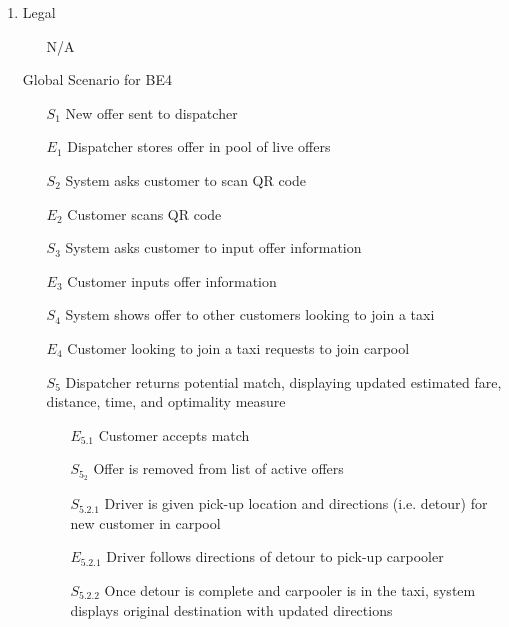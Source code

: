 \documentclass[]{article}
\begin{document}
\begin{enumerate}[{\textbf{BE}}1.]
\begin{enumerate}[{VP4}.1]
        \item Legal
            \begin{enumerate}
                \item[N/A]
            \end{enumerate}
        \item[Global] Scenario for BE4
            \begin{enumerate}
                \item[$S_1$] New offer sent to dispatcher
                \item[$E_1$] Dispatcher stores offer in pool of live offers
                \item[$S_2$] System asks customer to scan QR code
                \item[$E_2$] Customer scans QR code
                \item[$S_3$] System asks customer to input offer information
                \item[$E_3$] Customer inputs offer information
                \item[$S_4$] System shows offer to other customers looking to join a taxi
                \item[$E_4$] Customer looking to join a taxi requests to join carpool
                \item[$S_5$] Dispatcher returns potential match, displaying updated estimated fare, distance, time, and optimality measure
                \begin{enumerate}
                    \item[$E_{5.1}$] Customer accepts match
                      \item[$S_{5_2}$] Offer is removed from list of active offers
                    	\item[$S_{5.2.1}$] Driver is given pick-up location and directions (i.e. detour) for new customer in carpool
                    	\item[$E_{5.2.1}$] Driver follows directions of detour to pick-up carpooler
                    	\item[$S_{5.2.2}$] Once detour is complete and carpooler is in the taxi, system displays original destination with updated directions
               

\end{enumerate}
\end{enumerate}
\end{enumerate}
\end{enumerate}
\end{document}

